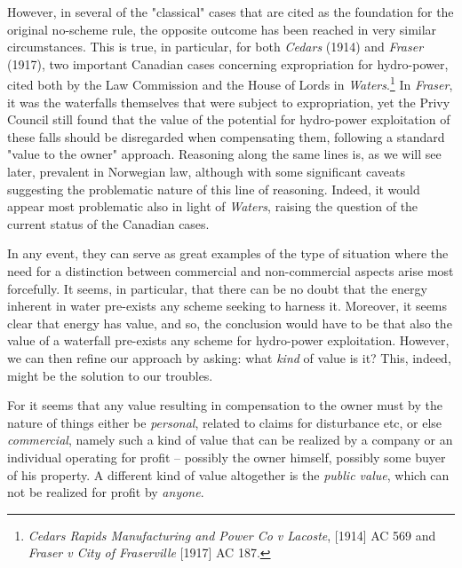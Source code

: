 However, in several of the "classical" cases that are cited as the foundation for the original no-scheme rule, the opposite outcome has been reached in very similar circumstances. This is true, in particular, for both \emph{Cedars} (1914) and \emph{Fraser} (1917), two important Canadian cases concerning expropriation for hydro-power, cited both by the Law Commission and the House of Lords in \emph{Waters}.\footnote{\emph{Cedars Rapids Manufacturing and Power Co v Lacoste}, [1914] AC 569 and \emph{Fraser v City of Fraserville} [1917] AC 187.} In \emph{Fraser}, it was the waterfalls themselves that were subject to expropriation, yet the Privy Council still found that the value of the potential for hydro-power exploitation of these falls should be disregarded when compensating them, following a standard "value to the owner" approach. Reasoning along the same lines is, as we will see later, prevalent in Norwegian law, although with some significant caveats suggesting the problematic nature of this line of reasoning. Indeed, it would appear most problematic also in light of \emph{Waters}, raising the question of the current status of the Canadian cases.

In any event, they can serve as great examples of the type of situation where the need for a distinction between commercial and non-commercial aspects arise most forcefully. It seems, in particular, that there can be no doubt that the energy inherent in water pre-exists any scheme seeking to harness it. Moreover, it seems clear that energy has value, and so, the conclusion would have to be that also the value of a waterfall pre-exists any scheme for hydro-power exploitation. However, we can then refine our approach by asking: what \emph{kind} of value is it? This, indeed, might be the solution to our troubles. 

For it seems that any value resulting in compensation to the owner must by the nature of things either be \emph{personal}, related to claims for disturbance etc, or else \emph{commercial}, namely such a kind of value that can be realized by a company or an individual operating for profit -- possibly the owner himself, possibly some buyer of his property. A different kind of value altogether is the \emph{public value}, which can not be realized for profit by \emph{anyone}. 

